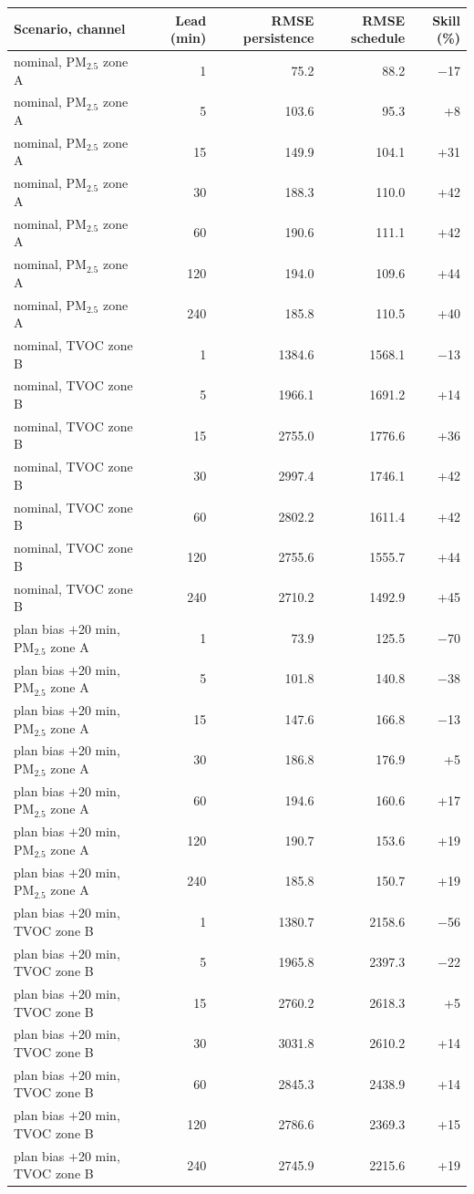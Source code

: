 \begin{tabular}{lrrrr}
\toprule
Scenario, channel & Lead (min) & RMSE persistence & RMSE schedule & Skill (\%)\\
\midrule
nominal, PM$_{2.5}$ zone A & 1 & 75.2 & 88.2 & \ensuremath{-}17\\
nominal, PM$_{2.5}$ zone A & 5 & 103.6 & 95.3 & +8\\
nominal, PM$_{2.5}$ zone A & 15 & 149.9 & 104.1 & +31\\
nominal, PM$_{2.5}$ zone A & 30 & 188.3 & 110.0 & +42\\
nominal, PM$_{2.5}$ zone A & 60 & 190.6 & 111.1 & +42\\
nominal, PM$_{2.5}$ zone A & 120 & 194.0 & 109.6 & +44\\
nominal, PM$_{2.5}$ zone A & 240 & 185.8 & 110.5 & +40\\
nominal, TVOC zone B & 1 & 1384.6 & 1568.1 & \ensuremath{-}13\\
nominal, TVOC zone B & 5 & 1966.1 & 1691.2 & +14\\
nominal, TVOC zone B & 15 & 2755.0 & 1776.6 & +36\\
nominal, TVOC zone B & 30 & 2997.4 & 1746.1 & +42\\
nominal, TVOC zone B & 60 & 2802.2 & 1611.4 & +42\\
nominal, TVOC zone B & 120 & 2755.6 & 1555.7 & +44\\
nominal, TVOC zone B & 240 & 2710.2 & 1492.9 & +45\\
plan bias $+$20 min, PM$_{2.5}$ zone A & 1 & 73.9 & 125.5 & \ensuremath{-}70\\
plan bias $+$20 min, PM$_{2.5}$ zone A & 5 & 101.8 & 140.8 & \ensuremath{-}38\\
plan bias $+$20 min, PM$_{2.5}$ zone A & 15 & 147.6 & 166.8 & \ensuremath{-}13\\
plan bias $+$20 min, PM$_{2.5}$ zone A & 30 & 186.8 & 176.9 & +5\\
plan bias $+$20 min, PM$_{2.5}$ zone A & 60 & 194.6 & 160.6 & +17\\
plan bias $+$20 min, PM$_{2.5}$ zone A & 120 & 190.7 & 153.6 & +19\\
plan bias $+$20 min, PM$_{2.5}$ zone A & 240 & 185.8 & 150.7 & +19\\
plan bias $+$20 min, TVOC zone B & 1 & 1380.7 & 2158.6 & \ensuremath{-}56\\
plan bias $+$20 min, TVOC zone B & 5 & 1965.8 & 2397.3 & \ensuremath{-}22\\
plan bias $+$20 min, TVOC zone B & 15 & 2760.2 & 2618.3 & +5\\
plan bias $+$20 min, TVOC zone B & 30 & 3031.8 & 2610.2 & +14\\
plan bias $+$20 min, TVOC zone B & 60 & 2845.3 & 2438.9 & +14\\
plan bias $+$20 min, TVOC zone B & 120 & 2786.6 & 2369.3 & +15\\
plan bias $+$20 min, TVOC zone B & 240 & 2745.9 & 2215.6 & +19\\
\bottomrule
\end{tabular}
